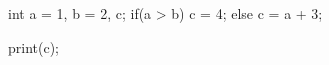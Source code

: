 \begin{minipage}[t]{2.5in}
\begin{AVerb}[numbers=left]
int a = 1, b = 2, c;
if(a > b) 
  c = 4;
else     
  c = a + 3;

print(c);
\end{AVerb}
\end{minipage}
